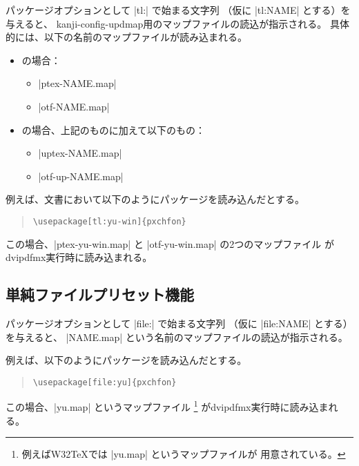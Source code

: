 \documentclass[uplatex,dvipdfmx,a4paper]{jsarticle}
\providecommand{\Strong}[1]{\textsf{#1}}
\begin{document}
パッケージオプションとして |tl:| で始まる文字列
（仮に |tl:NAME| とする）を与えると、
kanji-config-updmap用のマップファイルの読込が指示される。
具体的には、以下の名前のマップファイルが読み込まれる。

\begin{itemize}
\item {\pLaTeX}の場合：
  \begin{itemize}
  \item |ptex-NAME.map|
  \item |otf-NAME.map|
  \end{itemize}
\item {\upLaTeX}の場合、\Strong{上記のものに加えて}以下のもの：
  \begin{itemize}
  \item |uptex-NAME.map|
  \item |otf-up-NAME.map|
  \end{itemize}
\end{itemize}

例えば、{\pLaTeX}文書において以下のようにパッケージを読み込んだとする。

\begin{quote}\small\begin{verbatim}
\usepackage[tl:yu-win]{pxchfon}
\end{verbatim}\end{quote}

この場合、|ptex-yu-win.map| と |otf-yu-win.map| の2つのマップファイル
がdvipdfmx実行時に読み込まれる。

\subsection{単純ファイルプリセット機能}

パッケージオプションとして |file:| で始まる文字列
（仮に |file:NAME| とする）を与えると、
|NAME.map| という名前のマップファイルの読込が指示される。

例えば、以下のようにパッケージを読み込んだとする。

\begin{quote}\small\begin{verbatim}
\usepackage[file:yu]{pxchfon}
\end{verbatim}\end{quote}

この場合、|yu.map| というマップファイル
\footnote{例えばW32{\TeX}では |yu.map| というマップファイルが
  用意されている。}%
がdvipdfmx実行時に読み込まれる。
\end{document}
